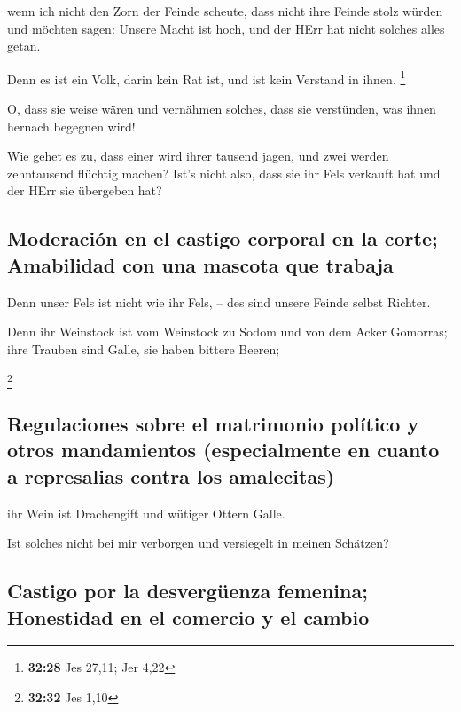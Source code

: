  wenn ich nicht den Zorn der Feinde scheute, dass nicht
ihre Feinde stolz würden und möchten sagen: Unsere Macht ist hoch, und
der HErr hat nicht solches alles getan.

 Denn es ist ein Volk, darin kein Rat ist, und ist kein
Verstand in ihnen. \footnote{\textbf{32:28} Jes 27,11; Jer 4,22}

 O, dass sie weise wären und vernähmen solches, dass sie
verstünden, was ihnen hernach begegnen wird!

 Wie gehet es zu, dass einer wird ihrer tausend jagen,
und zwei werden zehntausend flüchtig machen? Ist's nicht also, dass sie
ihr Fels verkauft hat und der HErr sie übergeben hat?

\hypertarget{moderaciuxf3n-en-el-castigo-corporal-en-la-corte-amabilidad-con-una-mascota-que-trabaja}{%
\subsection{Moderación en el castigo corporal en la corte; Amabilidad
con una mascota que
trabaja}\label{moderaciuxf3n-en-el-castigo-corporal-en-la-corte-amabilidad-con-una-mascota-que-trabaja}}

 Denn unser Fels ist nicht wie ihr Fels, -- des sind
unsere Feinde selbst Richter.

 Denn ihr Weinstock ist vom Weinstock zu Sodom und von
dem Acker Gomorras; ihre Trauben sind Galle, sie haben bittere Beeren;

\footnote{\textbf{32:32} Jes 1,10}

\hypertarget{regulaciones-sobre-el-matrimonio-poluxedtico-y-otros-mandamientos-especialmente-en-cuanto-a-represalias-contra-los-amalecitas}{%
\subsection{Regulaciones sobre el matrimonio político y otros
mandamientos (especialmente en cuanto a represalias contra los
amalecitas)}\label{regulaciones-sobre-el-matrimonio-poluxedtico-y-otros-mandamientos-especialmente-en-cuanto-a-represalias-contra-los-amalecitas}}

 ihr Wein ist Drachengift und wütiger Ottern Galle.

 Ist solches nicht bei mir verborgen und versiegelt in
meinen Schätzen?

\hypertarget{castigo-por-la-desverguxfcenza-femenina-honestidad-en-el-comercio-y-el-cambio}{%
\subsection{Castigo por la desvergüenza femenina; Honestidad en el
comercio y el
cambio}\label{castigo-por-la-desverguxfcenza-femenina-honestidad-en-el-comercio-y-el-cambio}}

